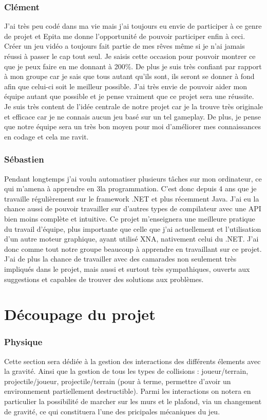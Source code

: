 ﻿\documentclass[12pt]{article}
\begin{document}
\subsubsection{Clément }
J'ai très peu codé dans ma vie mais j'ai toujours eu envie de participer à ce genre de
projet et Epita me donne l'opportunité de pouvoir participer enfin à ceci. Créer un jeu
vidéo a toujours fait partie de mes rêves même si je n'ai jamais réussi à passer le cap
tout seul. Je saisis cette occasion pour pouvoir montrer ce que je peux faire en me
donnant à 200\%. De plus je suis très confiant par rapport à mon groupe car je sais
que tous autant qu'ils sont, ils seront se donner à fond afin que celui-ci soit le
meilleur possible. J'ai très envie de pouvoir aider mon équipe autant que possible et
je pense vraiment que ce projet sera une réussite. Je suis très content de l'idée
centrale de notre projet car je la trouve très originale et efficace car je ne connais
aucun jeu basé sur un tel gameplay. De plus, je pense que notre équipe sera un très 
bon moyen pour moi d'améliorer mes connaissances en codage et cela me ravit. 

\subsubsection{Sébastien }
Pendant longtemps j'ai voulu automatiser plusieurs tâches sur mon ordinateur, ce qui
m'amena à apprendre en 3\ieme la programmation. C'est donc depuis 4 ans que je travaille
régulièrement sur le framework .NET et plus récemment Java. J'ai eu la chance aussi de
pouvoir travailler sur d'autres types de compilateur avec une API bien moins complète
et intuitive. Ce projet m'enseignera une meilleure pratique du travail d'équipe, plus
importante que celle que j'ai actuellement et l'utilisation d'un autre moteur graphique,
ayant utilisé XNA, nativement celui du .NET. J'ai donc comme tout notre groupe beaucoup
à apprendre en travaillant sur ce projet. J'ai de plus la chance de travailler avec des
camarades non seulement très impliqués dans le projet, mais aussi et surtout très sympathiques,
ouverts aux suggestions et capables de trouver des solutions aux problèmes.

\section{Découpage du projet}
\subsubsection{Physique}
Cette section sera dédiée à la gestion des interactions des différents élements avec
la gravité. Ainsi que la gestion de tous les types de collisions : joueur/terrain,
projectile/joueur, projectile/terrain (pour à terme, permettre d’avoir un environnement
partiellement destructible).
Parmi les interactions on notera en particulier la possibilité de marcher sur les murs 
et le plafond, via un changement de gravité, ce qui constituera l’une des pricipales
mécaniques du jeu.
\end{document}
